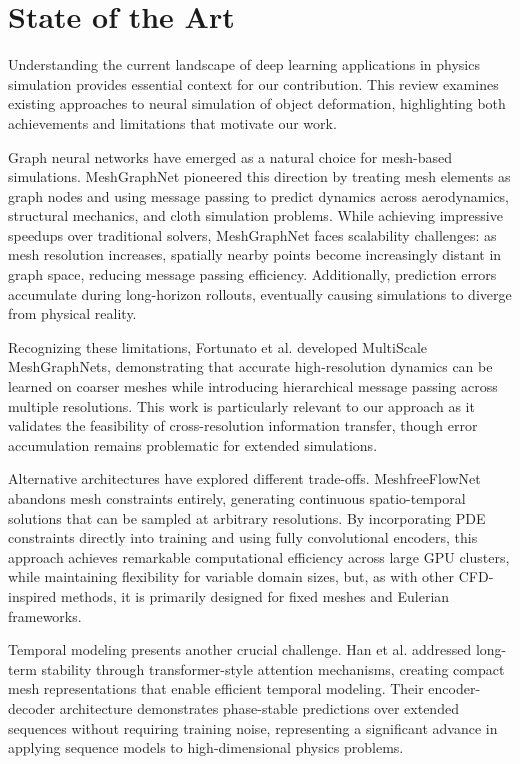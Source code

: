 \section*{State of the Art}

Understanding the current landscape of deep learning applications in physics simulation provides essential context for our contribution. This review examines existing approaches to neural simulation of object deformation, highlighting both achievements and limitations that motivate our work.

Graph neural networks have emerged as a natural choice for mesh-based simulations. MeshGraphNet \cite{pfaffLearningMeshBasedSimulation2021a} pioneered this direction by treating mesh elements as graph nodes and using message passing to predict dynamics across aerodynamics, structural mechanics, and cloth simulation problems. While achieving impressive speedups over traditional solvers, MeshGraphNet faces scalability challenges: as mesh resolution increases, spatially nearby points become increasingly distant in graph space, reducing message passing efficiency. Additionally, prediction errors accumulate during long-horizon rollouts, eventually causing simulations to diverge from physical reality.

Recognizing these limitations, Fortunato et al. \cite{fortunatoMultiScaleMeshGraphNets2022} developed MultiScale MeshGraphNets, demonstrating that accurate high-resolution dynamics can be learned on coarser meshes while introducing hierarchical message passing across multiple resolutions. This work is particularly relevant to our approach as it validates the feasibility of cross-resolution information transfer, though error accumulation remains problematic for extended simulations.

Alternative architectures have explored different trade-offs. MeshfreeFlowNet \cite{jiangMeshfreeFlowNetPhysicsConstrainedDeep2020} abandons mesh constraints entirely, generating continuous spatio-temporal solutions that can be sampled at arbitrary resolutions. By incorporating PDE constraints directly into training and using fully convolutional encoders, this approach achieves remarkable computational efficiency across large GPU clusters, while maintaining flexibility for variable domain sizes, but, as with other CFD-inspired methods, it is primarily designed for fixed meshes and Eulerian frameworks.

Temporal modeling presents another crucial challenge. Han et al. \cite{hanPredictingPhysicsMeshreduced2022a} addressed long-term stability through transformer-style attention mechanisms, creating compact mesh representations that enable efficient temporal modeling. Their encoder-decoder architecture demonstrates phase-stable predictions over extended sequences without requiring training noise, representing a significant advance in applying sequence models to high-dimensional physics problems.

